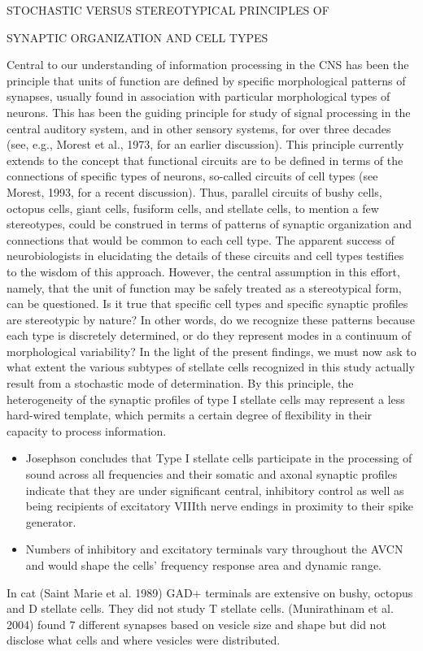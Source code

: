 \documentclass[10pt,a4paper]{article}
\begin{document}
STOCHASTIC VERSUS STEREOTYPICAL PRINCIPLES OF

SYNAPTIC ORGANIZATION AND CELL TYPES

Central to our understanding of information processing in the CNS has been the
principle that units of function are defined by specific morphological patterns
of synapses, usually found in association with particular morphological types of
neurons. This has been the guiding principle for study of signal processing in
the central auditory system, and in other sensory systems, for over three
decades (see, e.g., Morest et al., 1973, for an earlier discussion). This
principle currently extends to the concept that functional circuits are to be
defined in terms of the connections of specific types of neurons, so-called
circuits of cell types (see Morest, 1993, for a recent discussion). Thus,
parallel circuits of bushy cells, octopus cells, giant cells, fusiform cells,
and stellate cells, to mention a few stereotypes, could be construed in terms of
patterns of synaptic organization and connections that would be common to each
cell type.  The apparent success of neurobiologists in elucidating the details
of these circuits and cell types testifies to the wisdom of this approach.
However, the central assumption in this effort, namely, that the unit of
function may be safely treated as a stereotypical form, can be questioned. Is it
true that specific cell types and specific synaptic profiles are stereotypic by
nature? In other words, do we recognize these patterns because each type is
discretely determined, or do they represent modes in a continuum of
morphological variability? In the light of the present findings, we must now ask
to what extent the various subtypes of stellate cells recognized in this study
actually result from a stochastic mode of determination. By this principle, the
heterogeneity of the synaptic profiles of type I stellate cells may represent a
less hard-wired template, which permits a certain degree of flexibility in their
capacity to process information.


\begin{itemize}
\item Josephson concludes that Type I stellate cells participate in the
  processing of sound across all frequencies and their somatic and axonal
  synaptic profiles indicate that they are under significant central, inhibitory
  control as well as being recipients of excitatory VIIIth nerve endings in
  proximity to their spike generator.
\item Numbers of inhibitory and excitatory terminals vary throughout the AVCN
  and would shape the cells{\textquoteright} frequency response area and dynamic
  range.
\end{itemize}
In cat (Saint Marie et al. 1989) GAD+ terminals are extensive on bushy, octopus
and D stellate cells. They did not study T stellate cells.  (Munirathinam et
al. 2004) found 7 different synapses based on vesicle size and shape but did not
disclose what cells and where vesicles were distributed.
\end{document}
